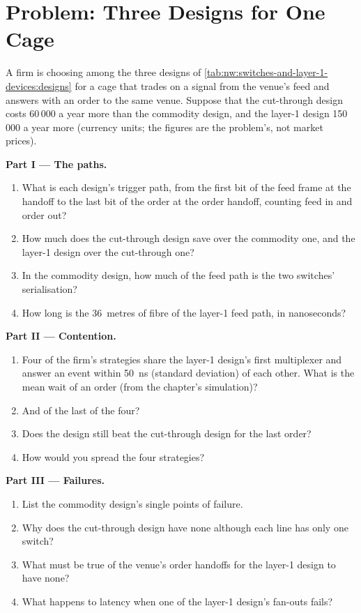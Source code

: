 \section{Problem: Three Designs for One Cage}

\begin{problem}\label{pb:nw:switches-and-layer-1-devices:1}
A firm is choosing among the three designs of \cref{tab:nw:switches-and-layer-1-devices:designs} for a cage that trades on a signal
from the venue's feed and answers with an order to the same venue. Suppose that the cut-through design costs 60\,000 a year more
than the commodity design, and the layer-1 design 150\,000 a year more (currency units; the figures are the problem's, not market
prices).

\medskip\noindent\textbf{Part I --- The paths.}
\begin{enumerate}
\item What is each design's trigger path, from the first bit of the feed frame at the handoff to the last bit of the order at the
  order handoff, counting feed in and order out?
\item How much does the cut-through design save over the commodity one, and the layer-1 design over the cut-through one?
\item In the commodity design, how much of the feed path is the two switches' serialisation?
\item How long is the 36~metres of fibre of the layer-1 feed path, in nanoseconds?
\end{enumerate}

\medskip\noindent\textbf{Part II --- Contention.}
\begin{enumerate}[resume]
\item Four of the firm's strategies share the layer-1 design's first multiplexer and answer an event within
  \qty{50}{\nano\second} (standard deviation) of each other. What is the mean wait of an order (from the chapter's simulation)?
\item And of the last of the four?
\item Does the design still beat the cut-through design for the last order?
\item How would you spread the four strategies?
\end{enumerate}

\medskip\noindent\textbf{Part III --- Failures.}
\begin{enumerate}[resume]
\item List the commodity design's single points of failure.
\item Why does the cut-through design have none although each line has only one switch?
\item What must be true of the venue's order handoffs for the layer-1 design to have none?
\item What happens to latency when one of the layer-1 design's fan-outs fails?
\end{enumerate}


\end{problem}

